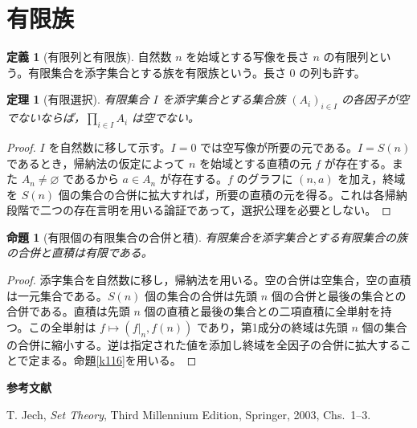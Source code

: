 \documentclass[a5paper,10pt,dvipdfmx]{jsarticle}
\theoremstyle{definition}
\newtheorem{defn}[ruledef]{定義}
\theoremstyle{plain}
\newtheorem{prop}[ruledef]{命題}
\newtheorem{thm}[ruledef]{定理}
\begin{document}
\section{有限族}
\begin{defn}[有限列と有限族]\label{k118}
自然数 $n$ を始域とする写像を長さ $n$ の有限列という。有限集合を添字集合とする族を有限族という。長さ $0$ の列も許す。
\end{defn}
\begin{thm}[有限選択]\label{k119}
有限集合 $I$ を添字集合とする集合族 $(A_i)_{i\in I}$ の各因子が空でないならば，$\prod_{i\in I}A_i$ は空でない。
\end{thm}
\begin{proof}
$I$ を自然数に移して示す。$I=0$ では空写像が所要の元である。$I=S(n)$ であるとき，帰納法の仮定によって $n$ を始域とする直積の元 $f$ が存在する。また $A_n\ne\varnothing$ であるから $a\in A_n$ が存在する。$f$ のグラフに $(n,a)$ を加え，終域を $S(n)$ 個の集合の合併に拡大すれば，所要の直積の元を得る。これは各帰納段階で二つの存在言明を用いる論証であって，選択公理を必要としない。
\end{proof}
\begin{prop}[有限個の有限集合の合併と積]\label{k120}
有限集合を添字集合とする有限集合の族の合併と直積は有限である。
\end{prop}
\begin{proof}
添字集合を自然数に移し，帰納法を用いる。空の合併は空集合，空の直積は一元集合である。$S(n)$ 個の集合の合併は先頭 $n$ 個の合併と最後の集合との合併である。直積は先頭 $n$ 個の直積と最後の集合との二項直積に全単射を持つ。この全単射は $f\mapsto(f|_n,f(n))$ であり，第1成分の終域は先頭 $n$ 個の集合の合併に縮小する。逆は指定された値を添加し終域を全因子の合併に拡大することで定まる。命題\ref{k116}を用いる。
\end{proof}
\par\medskip\noindent\textbf{参考文献}\par\smallskip
\noindent T. Jech, \textit{Set Theory}, Third Millennium Edition, Springer, 2003, Chs.~1--3.
\end{document}
